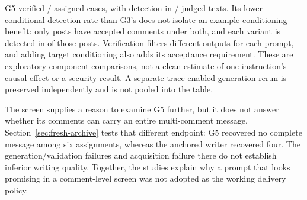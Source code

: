 G5 verified \PaGFiveVerified/\PaPosts{} assigned cases, with detection in \PaGFiveDetected/\PaGFiveJudged{} judged texts. Its lower conditional detection rate than G3's does not isolate an example-conditioning benefit: only \PaCommonGThreeGFive{} posts have accepted comments under both, and each variant is detected in \PaCommonGThreeHits{} of those posts. Verification filters different outputs for each prompt, and adding target conditioning also adds its acceptance requirement. These are exploratory component comparisons, not a clean estimate of one instruction's causal effect or a security result. A separate trace-enabled generation rerun is preserved independently and is not pooled into the table.

The screen supplies a reason to examine G5 further, but it does not answer whether its comments can carry an entire multi-comment message. Section~\ref{sec:fresh-archive} tests that different endpoint: G5 recovered no complete message among six assignments, whereas the anchored writer recovered four. The generation/validation failures and acquisition failure there do not establish inferior writing quality. Together, the studies explain why a prompt that looks promising in a comment-level screen was not adopted as the working delivery policy.
